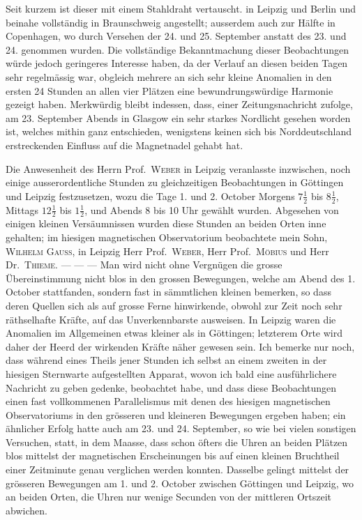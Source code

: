 \expandafter\def\csname HistoricalNoteText536\endcsname{Seit kurzem ist dieser mit einem Stahldraht vertauscht.}
in Leipzig und Berlin und beinahe vollständig in Braunschweig angestellt; ausserdem auch zur Hälfte in Copenhagen, wo durch Versehen der 24. und 25. September anstatt des 23. und 24. genommen wurden. Die vollständige Bekanntmachung dieser Beobachtungen würde jedoch geringeres Interesse haben, da der Verlauf an diesen beiden Tagen sehr regelmässig war, obgleich mehrere an sich sehr kleine Anomalien in den ersten 24 Stunden an allen vier Plätzen eine bewundrungswürdige Harmonie gezeigt haben. Merkwürdig bleibt indessen, dass, einer Zeitungsnachricht zufolge, am 23. September Abends in Glasgow ein sehr starkes Nordlicht gesehen worden ist, welches mithin ganz entschieden, wenigstens keinen sich bis Norddeutschland erstreckenden Einfluss auf die Magnetnadel gehabt hat.

Die Anwesenheit des Herrn Prof.\ \textsc{Weber} in Leipzig veranlasste inzwischen, noch einige ausserordentliche Stunden zu gleichzeitigen Beobachtungen in Göttingen und Leipzig festzusetzen, wozu die Tage 1. und 2. October Morgens $7\tfrac12$ bis $8\tfrac12$, Mittags $12\tfrac12$ bis $1\tfrac12$, und Abends 8 bis 10 Uhr gewählt wurden. Abgesehen von einigen kleinen Versäumnissen wurden diese Stunden an beiden Orten inne gehalten; im hiesigen magnetischen Observatorium beobachtete mein Sohn, \textsc{Wilhelm Gauss}, in Leipzig Herr Prof.\ \textsc{Weber}, Herr Prof.\ \textsc{Möbius} und Herr Dr.\ \textsc{Thieme}. — — — Man wird nicht ohne Vergnügen die grosse Übereinstimmung nicht blos in den grossen Bewegungen, welche am Abend des 1. October stattfanden, sondern fast in sämmtlichen kleinen bemerken, so dass deren Quellen sich als auf grosse Ferne hinwirkende, obwohl zur Zeit noch sehr räthselhafte Kräfte, auf das Unverkennbarste ausweisen. In Leipzig waren die Anomalien im Allgemeinen etwas kleiner als in Göttingen; letzterem Orte wird daher der Heerd der wirkenden Kräfte näher gewesen sein. Ich bemerke nur noch, dass während eines Theils jener Stunden ich selbst an einem zweiten in der hiesigen Sternwarte aufgestellten Apparat, wovon ich bald eine ausführlichere Nachricht zu geben gedenke, beobachtet habe, und dass diese Beobachtungen einen fast vollkommenen Parallelismus mit denen des hiesigen magnetischen Observatoriums in den grösseren und kleineren Bewegungen ergeben haben; ein ähnlicher Erfolg hatte auch am 23. und 24. September, so wie bei vielen sonstigen Versuchen, statt, in dem Maasse, dass schon öfters die Uhren an beiden Plätzen blos mittelst der magnetischen Erscheinungen bis auf einen kleinen Bruchtheil einer Zeitminute genau verglichen werden konnten. Dasselbe gelingt mittelst
der grösseren Bewegungen am 1. und 2. October zwischen Göttingen und Leipzig, wo an beiden Orten, die Uhren nur wenige Secunden von der mittleren Ortszeit abwichen.

